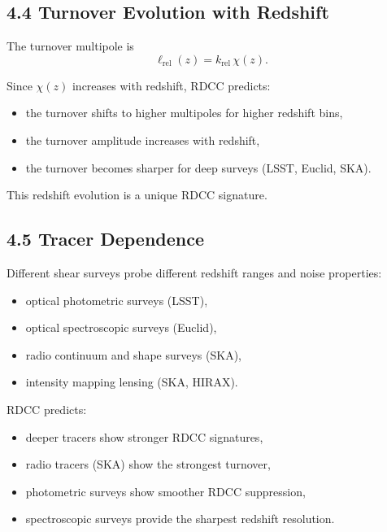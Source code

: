 \documentclass[11pt,a4paper]{article}
\begin{document}
\subsection*{4.4 Turnover Evolution with Redshift}

The turnover multipole is
\begin{equation}
    \ell_{\mathrm{rel}}(z)
    = k_{\mathrm{rel}}\,\chi(z).
\end{equation}

Since $\chi(z)$ increases with redshift, RDCC predicts:

\begin{itemize}
    \item the turnover shifts to higher multipoles for higher redshift bins,
    \item the turnover amplitude increases with redshift,
    \item the turnover becomes sharper for deep surveys (LSST, Euclid, SKA).
\end{itemize}

This redshift evolution is a unique RDCC signature.

\subsection*{4.5 Tracer Dependence}

Different shear surveys probe different redshift ranges and noise properties:

\begin{itemize}
    \item optical photometric surveys (LSST),
    \item optical spectroscopic surveys (Euclid),
    \item radio continuum and shape surveys (SKA),
    \item intensity mapping lensing (SKA, HIRAX).
\end{itemize}

RDCC predicts:

\begin{itemize}
    \item deeper tracers show stronger RDCC signatures,
    \item radio tracers (SKA) show the strongest turnover,
    \item photometric surveys show smoother RDCC suppression,
    \item spectroscopic surveys provide the sharpest redshift resolution.
\end{itemize}
\end{document}
